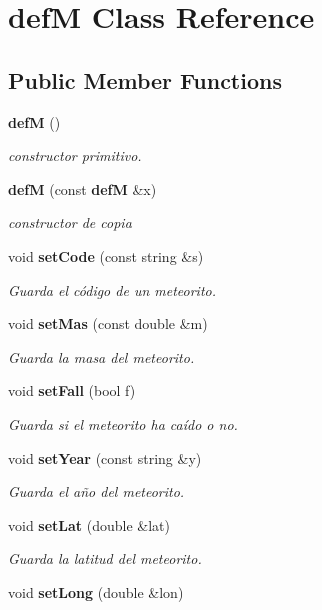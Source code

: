 \section{def\+M Class Reference}
\label{classdef_m}
\subsection*{Public Member Functions}
\begin{DoxyCompactItemize}
\item 
{\bf def\+M} ()
\begin{DoxyCompactList}\small\item\em constructor primitivo. \end{DoxyCompactList}\item 
{\bf def\+M} (const {\bf def\+M} \&x)
\begin{DoxyCompactList}\small\item\em constructor de copia \end{DoxyCompactList}\item 
void {\bf set\+Code} (const string \&s)
\begin{DoxyCompactList}\small\item\em Guarda el código de un meteorito. \end{DoxyCompactList}\item 
void {\bf set\+Mas} (const double \&m)
\begin{DoxyCompactList}\small\item\em Guarda la masa del meteorito. \end{DoxyCompactList}\item 
void {\bf set\+Fall} (bool f)
\begin{DoxyCompactList}\small\item\em Guarda si el meteorito ha caído o no. \end{DoxyCompactList}\item 
void {\bf set\+Year} (const string \&y)
\begin{DoxyCompactList}\small\item\em Guarda el año del meteorito. \end{DoxyCompactList}\item 
void {\bf set\+Lat} (double \&lat)
\begin{DoxyCompactList}\small\item\em Guarda la latitud del meteorito. \end{DoxyCompactList}\item 
void {\bf set\+Long} (double \&lon)

\end{DoxyCompactItemize}
